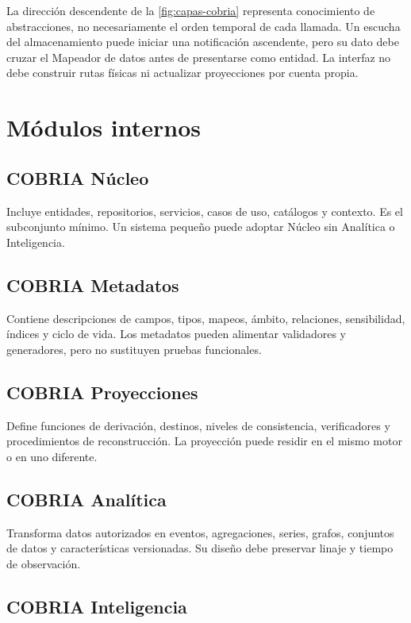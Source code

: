 La dirección descendente de la \cref{fig:capas-cobria} representa conocimiento de
abstracciones, no necesariamente el orden temporal de cada llamada. Un escucha del
almacenamiento puede iniciar una notificación ascendente, pero su dato debe cruzar el
Mapeador de datos antes de presentarse como entidad. La interfaz no debe construir rutas
físicas ni actualizar proyecciones por cuenta propia.

\section{Módulos internos}

\subsection{COBRIA Núcleo}

Incluye entidades, repositorios, servicios, casos de uso, catálogos y contexto. Es el
subconjunto mínimo. Un sistema pequeño puede adoptar Núcleo sin Analítica o Inteligencia.

\subsection{COBRIA Metadatos}

Contiene descripciones de campos, tipos, mapeos, ámbito, relaciones, sensibilidad,
índices y ciclo de vida. Los metadatos pueden alimentar validadores y generadores, pero
no sustituyen pruebas funcionales.

\subsection{COBRIA Proyecciones}

Define funciones de derivación, destinos, niveles de consistencia, verificadores y
procedimientos de reconstrucción. La proyección puede residir en el mismo motor o en uno
diferente.

\subsection{COBRIA Analítica}

Transforma datos autorizados en eventos, agregaciones, series, grafos, conjuntos de datos y
características versionadas. Su diseño debe preservar linaje y tiempo de observación.

\subsection{COBRIA Inteligencia}

